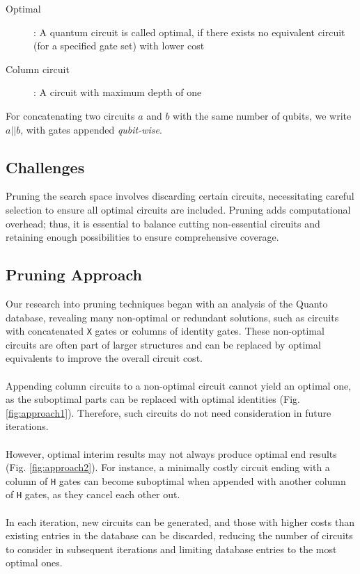 \begin{description}
	\item[Optimal]: A quantum circuit is called optimal, if there exists no equivalent circuit (for a specified gate set) with lower cost
	
	\item[Column circuit]: A circuit with maximum depth of one
\end{description}

For concatenating two circuits $a$ and $b$ with the same number of qubits, we write $a||b$, with gates appended \textit{qubit-wise}.


\subsection{Challenges}
Pruning the search space involves discarding certain circuits, necessitating careful selection to ensure all optimal circuits are included. Pruning adds computational overhead; thus, it is essential to balance cutting non-essential circuits and retaining enough possibilities to ensure comprehensive coverage.

\subsection{Pruning Approach}
Our research into pruning techniques began with an analysis of the Quanto database, revealing many non-optimal or redundant solutions, such as circuits with concatenated \texttt{X} gates or columns of identity gates. These non-optimal circuits are often part of larger structures and can be replaced by optimal equivalents to improve the overall circuit cost.
\\\\
Appending column circuits to a non-optimal circuit cannot yield an optimal one, as the suboptimal parts can be replaced with optimal identities (Fig. \ref{fig:approach1}). Therefore, such circuits do not need consideration in future iterations.
\\\\
However, optimal interim results may not always produce optimal end results (Fig. \ref{fig:approach2}). For instance, a minimally costly circuit ending with a column of \texttt{H} gates can become suboptimal when appended with another column of \texttt{H} gates, as they cancel each other out.
\\\\
In each iteration, new circuits can be generated, and those with higher costs than existing entries in the database can be discarded, reducing the number of circuits to consider in subsequent iterations and limiting database entries to the most optimal ones.

